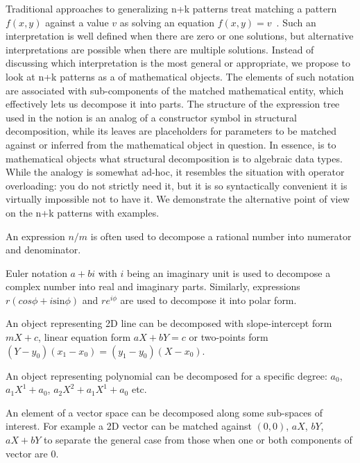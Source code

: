 Traditional approaches to generalizing n+k patterns treat matching a pattern 
$f(x,y)$ against a value $v$ as solving an equation $f(x,y)=v$~\cite{OosterhofThesis}. 
Such an interpretation is well defined when there are zero or one solutions,
but alternative interpretations are possible when there are multiple solutions. 
Instead of discussing which interpretation is the most general or appropriate, 
we propose to look at n+k patterns as a  of 
mathematical objects. The elements of such notation are associated with 
sub-components of the matched mathematical entity, which effectively lets us 
decompose it into parts. The structure of the expression tree used in the notion
is an analog of a constructor symbol in structural decomposition, while its 
leaves are placeholders for parameters to be matched against or inferred from 
the mathematical object in question. In essence,  
is to mathematical objects what structural decomposition is to algebraic data 
types. While the analogy is somewhat ad-hoc, it resembles the situation with 
operator overloading: you do not strictly need it, but it is so syntactically 
convenient it is virtually impossible not to have it. We demonstrate the 
alternative point of view on the n+k patterns with examples.

\begin{compactitem}
\setlength{\itemsep}{0pt}
\setlength{\parskip}{0pt}
\item An expression $n/m$ is often used to decompose a rational number into 
      numerator and denominator.
\item Euler notation $a+bi$ with $i$ being an imaginary unit is used to 
      decompose a complex number into real and imaginary parts. Similarly, 
      expressions $r(cos \phi + i\mathrm{sin} \phi)$ and $re^{i\phi}$ are used to 
      decompose it into polar form.
\item An object representing 2D line can be decomposed with slope-intercept form 
      $mX+c$, linear equation form $aX+bY=c$ or two-points form 
      $(Y-y_0)(x_1-x_0)=(y_1-y_0)(X-x_0)$.
\item An object representing polynomial can be decomposed for a specific degree: 
      $a_0$, $a_1X^1+a_0$, $a_2X^2+a_1X^1+a_0$ etc.
\item An element of a vector space can be decomposed along some sub-spaces of 
      interest. For example a 2D vector can be matched against $(0,0)$, $aX$, 
      $bY$, $aX+bY$ to separate the general case from those when one or both
      components of vector are $0$.
\end{compactitem}

